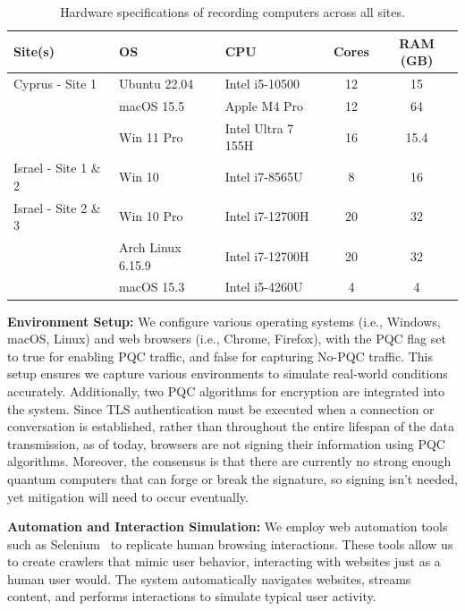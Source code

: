 \documentclass[10pt,journal]{IEEEtran}%
\begin{document}
\begin{table}[h]
\caption{Hardware specifications of recording computers across all sites.}
\label{tab:computers}
\centering
\setlength{\tabcolsep}{4pt}
\begin{tabular}{|l|l|l|c|c|}
\hline
\textbf{Site(s)} & \textbf{OS} & \textbf{CPU} & \textbf{Cores} & \textbf{RAM (GB)} \\ \hline \hline
Cyprus - Site 1 & Ubuntu 22.04 & Intel i5-10500 & 12 & 15 \\
 & macOS 15.5 & Apple M4 Pro & 12 & 64 \\
 & Win 11 Pro & Intel Ultra 7 155H & 16 & 15.4 \\ \hline
Israel - Site 1 \& 2 & Win 10 & Intel i7-8565U & 8 & 16 \\ \hline
Israel - Site 2 \& 3 & Win 10 Pro & Intel i7-12700H & 20 & 32 \\
 & Arch Linux 6.15.9 & Intel i7-12700H & 20 & 32 \\
 & macOS 15.3 & Intel i5-4260U & 4 & 4 \\ \hline
\end{tabular}
\end{table} 



{\bf Environment Setup:}
 We configure various operating systems (i.e., Windows, macOS, Linux) and web browsers (i.e., Chrome, Firefox), with the PQC flag set to true for enabling PQC traffic, and false for capturing No-PQC traffic. This setup ensures we capture various environments to simulate real-world conditions accurately.
Additionally, two PQC algorithms for encryption are integrated into the system.
Since TLS authentication must be executed when a connection or conversation is established, rather than throughout the entire lifespan of the data transmission, as of today, browsers are not signing their information using PQC algorithms. Moreover, the consensus is that there are currently no strong enough quantum computers that can forge or break the signature, so signing isn't needed, yet mitigation will need to occur eventually.


{\bf Automation and Interaction Simulation:} We employ web automation tools such as Selenium~\cite{selenium}  to replicate human browsing interactions. These tools allow us to create crawlers that mimic user behavior, interacting with websites just as a human user would. The system automatically navigates websites, streams content, and performs interactions to simulate typical user activity. 
\end{document}
